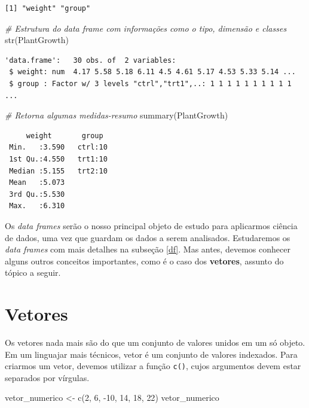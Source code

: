 \documentclass[
  brazilian,
]{book}
\newenvironment{Shaded}{\begin{snugshade}}{\end{snugshade}}
\newcommand{\CommentTok}[1]{\textcolor[rgb]{0.56,0.35,0.01}{\textit{#1}}}
\newcommand{\DecValTok}[1]{\textcolor[rgb]{0.00,0.00,0.81}{#1}}
\newcommand{\FunctionTok}[1]{\textcolor[rgb]{0.00,0.00,0.00}{#1}}
\newcommand{\NormalTok}[1]{#1}
\newcommand{\OtherTok}[1]{\textcolor[rgb]{0.56,0.35,0.01}{#1}}
\newcommand{\SpecialCharTok}[1]{\textcolor[rgb]{0.00,0.00,0.00}{#1}}
\begin{document}
\begin{verbatim}
[1] "weight" "group" 
\end{verbatim}

\begin{Shaded}
\begin{Highlighting}[]
\CommentTok{\# Estrutura do data frame com informações como o tipo, dimensão e classes}
\FunctionTok{str}\NormalTok{(PlantGrowth)}
\end{Highlighting}
\end{Shaded}

\begin{verbatim}
'data.frame':   30 obs. of  2 variables:
 $ weight: num  4.17 5.58 5.18 6.11 4.5 4.61 5.17 4.53 5.33 5.14 ...
 $ group : Factor w/ 3 levels "ctrl","trt1",..: 1 1 1 1 1 1 1 1 1 1 ...
\end{verbatim}

\begin{Shaded}
\begin{Highlighting}[]
\CommentTok{\# Retorna algumas medidas{-}resumo}
\FunctionTok{summary}\NormalTok{(PlantGrowth)}
\end{Highlighting}
\end{Shaded}

\begin{verbatim}
     weight       group   
 Min.   :3.590   ctrl:10  
 1st Qu.:4.550   trt1:10  
 Median :5.155   trt2:10  
 Mean   :5.073            
 3rd Qu.:5.530            
 Max.   :6.310            
\end{verbatim}

Os \emph{data frames} serão o nosso principal objeto de estudo para aplicarmos ciência de dados, uma vez que guardam os dados a serem analisados. Estudaremos os \emph{data frames} com mais detalhes na subseção \ref{df}. Mas antes, devemos conhecer alguns outros conceitos importantes, como é o caso dos \textbf{vetores}, assunto do tópico a seguir.

\hypertarget{vetor}{%
\section{Vetores}\label{vetor}}

Os vetores nada mais são do que um conjunto de valores unidos em um só objeto. Em um linguajar mais técnicos, vetor é um conjunto de valores indexados. Para criarmos um vetor, devemos utilizar a função \texttt{c()}, cujos argumentos devem estar separados por vírgulas.

\begin{Shaded}
\begin{Highlighting}[]
\NormalTok{vetor\_numerico }\OtherTok{\textless{}{-}} \FunctionTok{c}\NormalTok{(}\DecValTok{2}\NormalTok{, }\DecValTok{6}\NormalTok{, }\SpecialCharTok{{-}}\DecValTok{10}\NormalTok{, }\DecValTok{14}\NormalTok{, }\DecValTok{18}\NormalTok{, }\DecValTok{22}\NormalTok{)}
\NormalTok{vetor\_numerico}
\end{Highlighting}
\end{Shaded}
\end{document}
